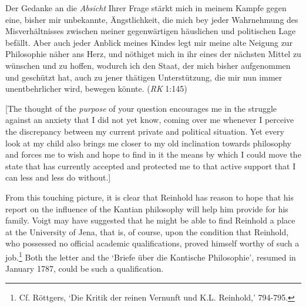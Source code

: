Der Gedanke an die \textit{Absicht }Ihrer Frage st\"{a}rkt mich in meinem Kampfe gegen eine, bisher mir unbekannte, \"{A}ngstlichkeit, die mich bey jeder Wahrnehmung des Misverh\"{a}ltnisses zwischen meiner gegenw\"{a}rtigen h\"{a}uslichen und politischen Lage bef\"{a}llt. Aber auch jeder Anblick meines Kindes legt mir meine alte Neigung zur Philosophie n\"{a}her ans Herz, und n\"{o}thiget mich in ihr eines der n\"{a}chsten Mittel zu w\"{u}nschen und zu hoffen, wodurch ich den Staat, der mich bisher aufgenommen und gesch\"{u}tzt hat, auch zu jener th\"{a}tigen Unterst\"{u}tzung, die mir nun immer unentbehrlicher wird, bewegen k\"{o}nnte. (\textit{RK} 1:145)

[The thought of the \textit{purpose} of your question encourages me in the struggle against an anxiety that I did not yet know, coming over me whenever I perceive the discrepancy between my current private and political situation. Yet every look at my child also brings me closer to my old inclination towards philosophy and forces me to wish and hope to find in it the means by which I could move the state that has currently accepted and protected me to that active support that I can less and less do without.]

From this touching picture, it is clear that Reinhold has reason to hope that his report on the influence of the Kantian philosophy will help him provide for his family. Voigt may have suggested that he might be able to find Reinhold a place at the University of Jena, that is, of course, upon the condition that Reinhold, who possessed no official academic qualifications, proved himself worthy of such a job.\footnote{ Cf. R\"{o}ttgers, `Die Kritik der reinen Vernunft und K.L. Reinhold,' 794{-}795.} Both the letter and the `Briefe \"{u}ber die Kantische Philosophie', resumed in January 1787, could be such a qualification. 

